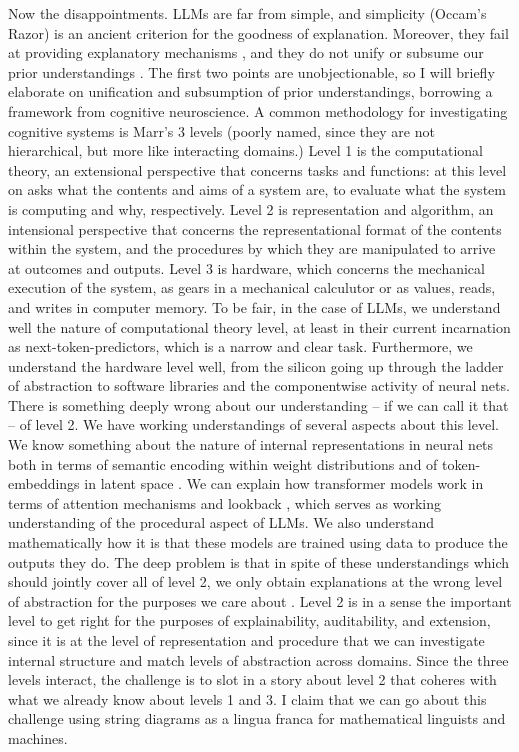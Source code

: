 Now the disappointments. LLMs are far from simple, and simplicity (Occam's Razor) is an ancient criterion for the goodness of explanation. Moreover, they fail at providing explanatory mechanisms \citep{}, and they do not unify or subsume our prior understandings \citep{}. The first two points are unobjectionable, so I will briefly elaborate on unification and subsumption of prior understandings, borrowing a framework from cognitive neuroscience. A common methodology for investigating cognitive systems is Marr's 3 levels \citep{} (poorly named, since they are not hierarchical, but more like interacting domains.) Level 1 is the computational theory, an extensional perspective that concerns tasks and functions: at this level on asks what the contents and aims of a system are, to evaluate what the system is computing and why, respectively. Level 2 is representation and algorithm, an intensional perspective that concerns the representational format of the contents within the system, and the procedures by which they are manipulated to arrive at outcomes and outputs. Level 3 is hardware, which concerns the mechanical execution of the system, as gears in a mechanical calculutor or as values, reads, and writes in computer memory. To be fair, in the case of LLMs, we understand well the nature of computational theory level, at least in their current incarnation as next-token-predictors, which is a narrow and clear task. Furthermore, we understand the hardware level well, from the silicon going up through the ladder of abstraction to software libraries and the componentwise activity of neural nets. There is something deeply wrong about our understanding -- if we can call it that -- of level 2. We have working understandings of several aspects about this level. We know something about the nature of internal representations in neural nets both in terms of semantic encoding within weight distributions \citep{} and of token-embeddings in latent space \citep{}. We can explain how transformer models work in terms of attention mechanisms and lookback \citep{}, which serves as working understanding of the procedural aspect of LLMs. We also understand mathematically how it is that these models are trained using data to produce the outputs they do. The deep problem is that in spite of these understandings which should jointly cover all of level 2, we only obtain explanations at the wrong level of abstraction for the purposes we care about \citep{}. Level 2 is in a sense the important level to get right for the purposes of explainability, auditability, and extension, since it is at the level of representation and procedure that we can investigate internal structure and match levels of abstraction across domains. Since the three levels interact, the challenge is to slot in a story about level 2 that coheres with what we already know about levels 1 and 3. I claim that we can go about this challenge using string diagrams as a lingua franca for mathematical linguists and machines.

